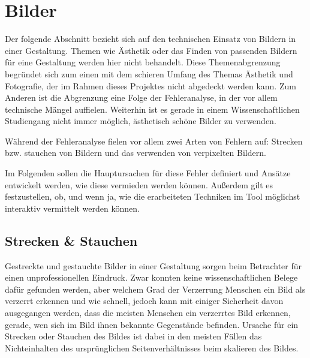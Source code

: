 
\newcommand{\chaptertitle}{Bilder}

\chapter{\chaptertitle} %

\label{Bilder} %

\lhead{\chaptername{} \thechapter{} - \emph{\chaptertitle}} %


Der folgende Abschnitt bezieht sich auf den technischen Einsatz von Bildern in einer Gestaltung. Themen wie Ästhetik oder das Finden von passenden Bildern für eine Gestaltung werden hier nicht behandelt.
Diese Themenabgrenzung begründet sich zum einen mit dem schieren Umfang des Themas Ästhetik und Fotografie, der im Rahmen dieses Projektes nicht abgedeckt werden kann. Zum Anderen ist die Abgrenzung eine Folge der Fehleranalyse, in der vor allem technische Mängel auffielen. Weiterhin ist es gerade in einem Wissenschaftlichen Studiengang nicht immer möglich, ästhetisch schöne Bilder zu verwenden.

Während der Fehleranalyse fielen vor allem zwei Arten von Fehlern auf: Strecken bzw. stauchen von Bildern und das verwenden von verpixelten Bildern.

Im Folgenden sollen die Hauptursachen für diese Fehler definiert und Ansätze entwickelt werden, wie diese vermieden werden können. Außerdem gilt es festzustellen, ob, und wenn ja, wie die erarbeiteten Techniken im Tool möglichst interaktiv vermittelt werden können.

\section{Strecken \& Stauchen}
Gestreckte und gestauchte Bilder in einer Gestaltung sorgen beim Betrachter für einen unprofessionellen Eindruck.
Zwar konnten keine wissenschaftlichen Belege dafür gefunden werden, aber welchem Grad der Verzerrung Menschen ein Bild als verzerrt erkennen und wie schnell, jedoch kann mit einiger Sicherheit davon ausgegangen werden, dass die meisten Menschen ein verzerrtes Bild erkennen, gerade, wen sich im Bild ihnen bekannte Gegenstände befinden.
Ursache für ein Strecken oder Stauchen des Bildes ist dabei in den meisten Fällen das Nichteinhalten des ursprünglichen Seitenverhältnisses beim skalieren des Bildes.

